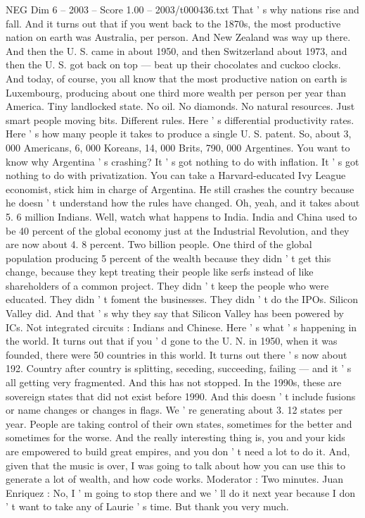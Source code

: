 \begin{textsample}{NEG Dim 6 – 2003 – Score 1.00 – 2003/t000436.txt}
That ' s why nations rise and fall.
And it turns out that if you went back to the 1870s, the most productive nation on earth was Australia, per person.
And New Zealand was way up there.
And then the U.
S. came in about 1950, and then Switzerland about 1973, and then the U.
S. got back on top — beat up their chocolates and cuckoo clocks.
And today, of course, you all know that the most productive nation on earth is Luxembourg, producing about one third more wealth per person per year than America.
Tiny landlocked state.
No oil.
No diamonds.
No natural resources.
Just smart people moving bits.
Different rules.
Here ' s differential productivity rates.
Here ' s how many people it takes to produce a single U.
S. patent.
So, about 3, 000 Americans, 6, 000 Koreans, 14, 000 Brits, 790, 000 Argentines.
You want to know why Argentina ' s crashing?
It ' s got nothing to do with inflation.
It ' s got nothing to do with privatization.
You can take a Harvard-educated Ivy League economist, stick him in charge of Argentina.
He still crashes the country because he doesn ' t understand how the rules have changed.
Oh, yeah, and it takes about 5. 6 million Indians.
Well, watch what happens to India.
India and China used to be 40 percent of the global economy just at the Industrial Revolution, and they are now about 4. 8 percent.
Two billion people.
One third of the global population producing 5 percent of the wealth because they didn ' t get this change, because they kept treating their people like serfs instead of like shareholders of a common project.
They didn ' t keep the people who were educated.
They didn ' t foment the businesses.
They didn ' t do the IPOs.
Silicon Valley did.
And that ' s why they say that Silicon Valley has been powered by ICs.
Not integrated circuits : Indians and Chinese.
Here ' s what ' s happening in the world.
It turns out that if you ' d gone to the U.
N. in 1950, when it was founded, there were 50 countries in this world.
It turns out there ' s now about 192.
Country after country is splitting, seceding, succeeding, failing — and it ' s all getting very fragmented.
And this has not stopped.
In the 1990s, these are sovereign states that did not exist before 1990.
And this doesn ' t include fusions or name changes or changes in flags.
We ' re generating about 3. 12 states per year.
People are taking control of their own states, sometimes for the better and sometimes for the worse.
And the really interesting thing is, you and your kids are empowered to build great empires, and you don ' t need a lot to do it.
And, given that the music is over, I was going to talk about how you can use this to generate a lot of wealth, and how code works.
Moderator : Two minutes.
Juan Enriquez : No, I ' m going to stop there and we ' ll do it next year because I don ' t want to take any of Laurie ' s time.
But thank you very much.

\end{textsample}
